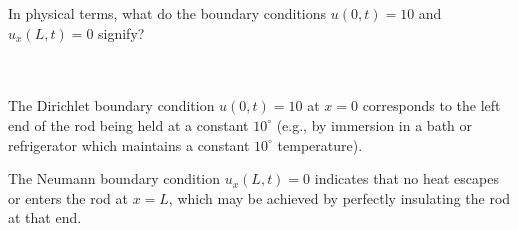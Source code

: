 In physical terms, what do the boundary conditions $u(0, t) = 10$ and $u_x(L, t) = 0$ signify?

\begin{solution}\ \\\\
    The Dirichlet boundary condition $u(0, t) = 10$ at $x = 0$ corresponds to the left end of the rod being held at a
    constant $10^{\circ}$ (e.g., by immersion in a bath or refrigerator which maintains a constant $10^{\circ}$ 
    temperature).

    The Neumann boundary condition $u_x(L, t) = 0$ indicates that no heat escapes or enters the rod at $x = L$, which 
    may be achieved by perfectly insulating the rod at that end.
    \ \\
\end{solution}